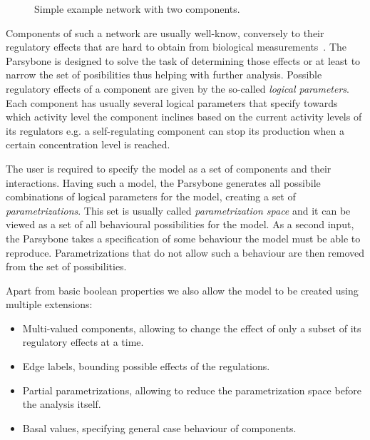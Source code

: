 \documentclass[12pt]{article}
\begin{document}
\begin{figure}[b]
\centering
{}
\caption{Simple example network with two components.}
\label{ExampNet}
\end{figure}

Components of such a network are usually well-know, conversely to their regulatory effects that are hard to obtain from biological measurements~\cite{Hecker09}. The Parsybone is designed to solve the task of determining those effects or at least to narrow the set of posibilities thus helping with further analysis. Possible regulatory effects of a component are given by the so-called \emph{logical parameters}. Each component has usually several logical parameters that specify towards which activity level the component inclines based on the current activity levels of its regulators e.g. a self-regulating component can stop its production when a certain concentration level is reached.

The user is required to specify the model as a set of components and their interactions. Having such a model, the Parsybone generates all possibile combinations of logical parameters for the model, creating a set of \emph{parametrizations}. This set is usually called \emph{parametrization space} and it can be viewed as a set of all behavioural possibilities for the model. As a second input, the Parsybone takes a specification of some behaviour the model must be able to reproduce. Parametrizations that do not allow such a behaviour are then removed from the set of possibilities.

Apart from basic boolean properties we also allow the model to be created using multiple extensions:
\begin{itemize}
\item Multi-valued components, allowing to change the effect of only a subset of its regulatory effects at a time.
\item Edge labels, bounding possible effects of the regulations.
\item Partial parametrizations, allowing to reduce the parametrization space before the analysis itself.
\item Basal values, specifying general case behaviour of components.
\end{itemize}
\end{document}
